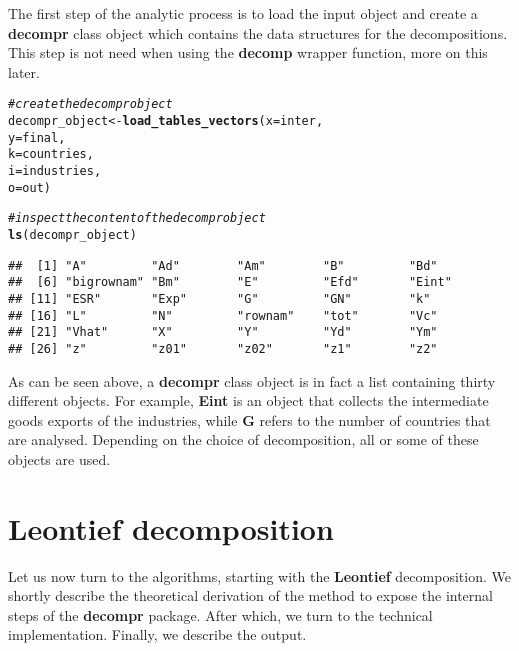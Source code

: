 \documentclass[a4paper]{article}\usepackage[]{graphicx}\usepackage[]{color}
\makeatletter
\newcommand{\hlcom}[1]{\textcolor[rgb]{0.678,0.584,0.686}{\textit{#1}}}%
\newcommand{\hlstd}[1]{\textcolor[rgb]{0.345,0.345,0.345}{#1}}%
\newcommand{\hlkwb}[1]{\textcolor[rgb]{0.69,0.353,0.396}{#1}}%
\newcommand{\hlkwc}[1]{\textcolor[rgb]{0.333,0.667,0.333}{#1}}%
\newcommand{\hlkwd}[1]{\textcolor[rgb]{0.737,0.353,0.396}{\textbf{#1}}}%
\newenvironment{kframe}{%
 \def\at@end@of@kframe{}%
 \ifinner\ifhmode%
  \def\at@end@of@kframe{\end{minipage}}%
  \begin{minipage}{\columnwidth}%
 \fi\fi%
 \def\FrameCommand##1{\hskip\@totalleftmargin \hskip-\fboxsep
 \colorbox{shadecolor}{##1}\hskip-\fboxsep
     \hskip-\linewidth \hskip-\@totalleftmargin \hskip\columnwidth}%
 \MakeFramed {\advance\hsize-\width
   \@totalleftmargin\z@ \linewidth\hsize
   \@setminipage}}%
 {\par\unskip\endMakeFramed%
 \at@end@of@kframe}
\newenvironment{knitrout}{}{} %
\makeatother
\begin{document}
The first step of the analytic process is to load the input object and create a \textbf{decompr} class object which contains the data structures for the decompositions.
This step is not need when using the \textbf{decomp} wrapper function, more on this later.

\begin{knitrout}
\color{fgcolor}\begin{kframe}
\begin{alltt}
\hlcom{# create the decompr object}
\hlstd{decompr_object} \hlkwb{<-} \hlkwd{load_tables_vectors}\hlstd{(} \hlkwc{x} \hlstd{= inter,}
                                       \hlkwc{y} \hlstd{= final,}
                                       \hlkwc{k} \hlstd{= countries,}
                                       \hlkwc{i} \hlstd{= industries,}
                                       \hlkwc{o} \hlstd{= out        )}

\hlcom{# inspect the content of the decompr object}
\hlkwd{ls}\hlstd{(decompr_object)}
\end{alltt}
\begin{verbatim}
##  [1] "A"         "Ad"        "Am"        "B"         "Bd"       
##  [6] "bigrownam" "Bm"        "E"         "Efd"       "Eint"     
## [11] "ESR"       "Exp"       "G"         "GN"        "k"        
## [16] "L"         "N"         "rownam"    "tot"       "Vc"       
## [21] "Vhat"      "X"         "Y"         "Yd"        "Ym"       
## [26] "z"         "z01"       "z02"       "z1"        "z2"
\end{verbatim}
\end{kframe}
\end{knitrout}

As can be seen above, a \textbf{decompr} class object is in fact a list containing thirty different objects.
For example, \textbf{Eint} is an object that collects the intermediate goods exports of the industries,
while \textbf{G} refers to the number of countries that are analysed.
Depending on the choice of decomposition, all or some of these objects are used.


\section{Leontief decomposition}
\label{sec:leontief}
Let us now turn to the algorithms, starting with the \textbf{Leontief} decomposition. We shortly describe the theoretical
derivation of the method to expose the internal steps of the \textbf{decompr} package. After which, we turn to the technical implementation.
Finally, we describe the output.
\end{document}
